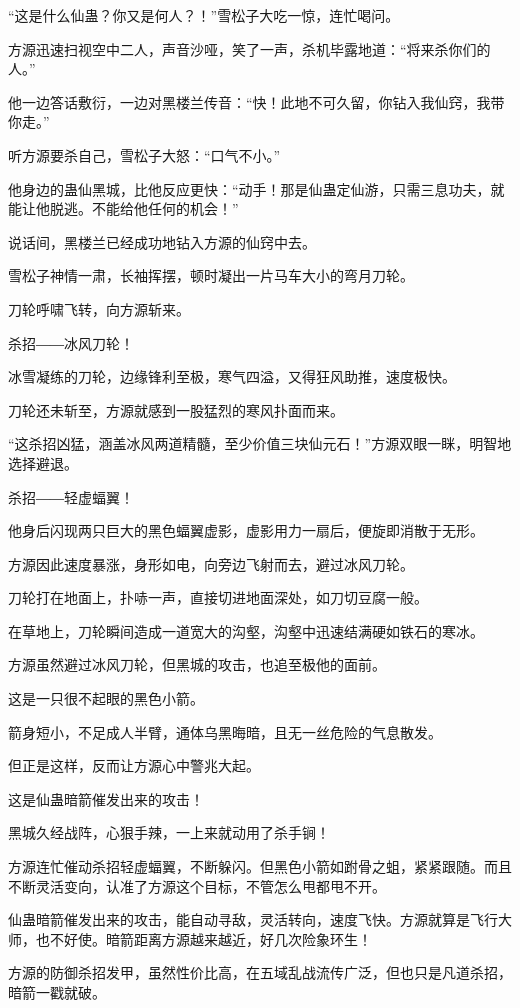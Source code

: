 \begin{this_body}
“这是什么仙蛊？你又是何人？！”雪松子大吃一惊，连忙喝问。

方源迅速扫视空中二人，声音沙哑，笑了一声，杀机毕露地道：“将来杀你们的人。”

他一边答话敷衍，一边对黑楼兰传音：“快！此地不可久留，你钻入我仙窍，我带你走。”

听方源要杀自己，雪松子大怒：“口气不小。”

他身边的蛊仙黑城，比他反应更快：“动手！那是仙蛊定仙游，只需三息功夫，就能让他脱逃。不能给他任何的机会！”

说话间，黑楼兰已经成功地钻入方源的仙窍中去。

雪松子神情一肃，长袖挥摆，顿时凝出一片马车大小的弯月刀轮。

刀轮呼啸飞转，向方源斩来。

杀招――冰风刀轮！

冰雪凝练的刀轮，边缘锋利至极，寒气四溢，又得狂风助推，速度极快。

刀轮还未斩至，方源就感到一股猛烈的寒风扑面而来。

“这杀招凶猛，涵盖冰风两道精髓，至少价值三块仙元石！”方源双眼一眯，明智地选择避退。

杀招――轻虚蝠翼！

他身后闪现两只巨大的黑色蝠翼虚影，虚影用力一扇后，便旋即消散于无形。

方源因此速度暴涨，身形如电，向旁边飞射而去，避过冰风刀轮。

刀轮打在地面上，扑哧一声，直接切进地面深处，如刀切豆腐一般。

在草地上，刀轮瞬间造成一道宽大的沟壑，沟壑中迅速结满硬如铁石的寒冰。

方源虽然避过冰风刀轮，但黑城的攻击，也追至极他的面前。

这是一只很不起眼的黑色小箭。

箭身短小，不足成人半臂，通体乌黑晦暗，且无一丝危险的气息散发。

但正是这样，反而让方源心中警兆大起。

这是仙蛊暗箭催发出来的攻击！

黑城久经战阵，心狠手辣，一上来就动用了杀手锏！

方源连忙催动杀招轻虚蝠翼，不断躲闪。但黑色小箭如跗骨之蛆，紧紧跟随。而且不断灵活变向，认准了方源这个目标，不管怎么甩都甩不开。

仙蛊暗箭催发出来的攻击，能自动寻敌，灵活转向，速度飞快。方源就算是飞行大师，也不好使。暗箭距离方源越来越近，好几次险象环生！

方源的防御杀招发甲，虽然性价比高，在五域乱战流传广泛，但也只是凡道杀招，暗箭一戳就破。


\end{this_body}
